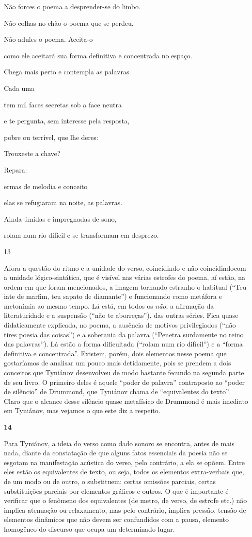 Não forces o poema a desprender-se do limbo.

Não colhas no chão o poema que se perdeu.

Não adules o poema. Aceita-o

como ele aceitará sua forma definitiva e concentrada no espaço.

Chega mais perto e contempla as palavras.

Cada uma

tem mil faces secretas sob a face neutra

e te pergunta, sem interesse pela resposta,

pobre ou terrível, que lhe deres:

Trouxeste a chave?

Repara:

ermas de melodia e conceito

elas se refugiaram na noite, as palavras.

Ainda úmidas e impregnadas de sono,

rolam num rio difícil e se transformam em desprezo.

13

Afora a questão do ritmo e a unidade do verso, coincidindo e não
coincidindocom a unidade lógico-sintática, que é visível nas várias
estrofes do poema, aí estão, na ordem em que foram mencionados, a imagem
tornando estranho o habitual (``Teu iate de marfim, teu sapato de
diamante'') e funcionando como metáfora e metonímia ao mesmo tempo. Lá
está, em todos os \emph{não}, a afirmação da literaturidade e a
suspensão (``não te aborreças''), das outras séries. Fica quase
didaticamente explicada, no poema, a ausência de motivos privilegiados
(``não tires poesia das coisas'') e a soberania da palavra (``Penetra
surdamente no reino das palavras''). Lá estão a forma dificultada
(``rolam num rio difícil'') e a ``forma definitiva e concentrada''.
Existem, porém, dois elementos nesse poema que gostaríamos de analisar
um pouco mais detidamente, pois se prendem a dois conceitos que Tyniánov
desenvolveu de modo bastante fecundo na segunda parte de seu livro. O
primeiro deles é aquele ``poder de palavra'' contraposto ao ``poder de
silêncio'' de Drummond, que Tyniánov chama de ``equivalentes do texto''.
Claro que o alcance desse silêncio quase metafísico de Drummond é mais
imediato em Tyniánov, mas vejamos o que este diz a respeito.

\textbf{14}

Para Tyniánov, a ideia do verso como dado sonoro se encontra, antes de
mais nada, diante da constatação de que alguns fatos essenciais da
poesia não se esgotam na manifestação acústica do verso, pelo contrário,
a ela se opõem. Entre eles estão os equivalentes de texto, ou seja,
todos os elementos extra-verbais que, de um modo ou de outro, o
substituem: certas omissões parciais, certas substituições parciais por
elementos gráficos e outros. O que é importante é verificar que o
fenômeno dos equivalentes (de metro, de verso, de estrofe etc.) não
implica atenuação ou relaxamento, mas pelo contrário, implica pressão,
tensão de elementos dinâmicos que não devem ser confundidos com a pausa,
elemento homogêneo do discurso que ocupa um determinado lugar.

